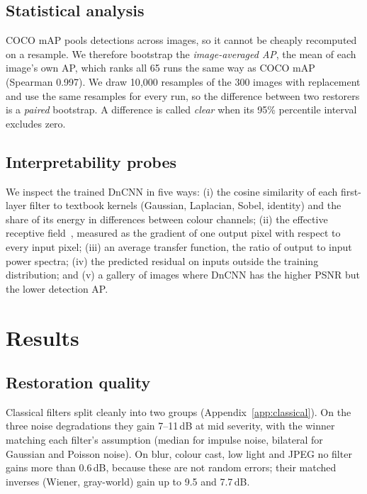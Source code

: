 \documentclass[11pt]{article}
\begin{document}
\subsection{Statistical analysis}
\label{sec:stats}
COCO mAP pools detections across images, so it cannot be cheaply recomputed on a resample. We therefore bootstrap the \emph{image-averaged AP}, the mean of each image's own AP, which ranks all 65 runs the same way as COCO mAP (Spearman 0.997). We draw 10{,}000 resamples of the 300 images with replacement and use the same resamples for every run, so the difference between two restorers is a \emph{paired} bootstrap. A difference is called \emph{clear} when its 95\% percentile interval excludes zero.

\subsection{Interpretability probes}
\label{sec:probes}
We inspect the trained DnCNN in five ways: (i) the cosine similarity of each first-layer filter to textbook kernels (Gaussian, Laplacian, Sobel, identity) and the share of its energy in differences between colour channels; (ii) the effective receptive field~\citep{luo2016erf}, measured as the gradient of one output pixel with respect to every input pixel; (iii) an average transfer function, the ratio of output to input power spectra; (iv) the predicted residual on inputs outside the training distribution; and (v) a gallery of images where DnCNN has the higher PSNR but the lower detection AP.

\section{Results}
\label{sec:results}

\subsection{Restoration quality}
\label{sec:psnr}
Classical filters split cleanly into two groups (Appendix~\ref{app:classical}). On the three noise degradations they gain 7--11\,dB at mid severity, with the winner matching each filter's assumption (median for impulse noise, bilateral for Gaussian and Poisson noise). On blur, colour cast, low light and JPEG no filter gains more than 0.6\,dB, because these are not random errors; their matched inverses (Wiener, gray-world) gain up to 9.5 and 7.7\,dB.
\end{document}
